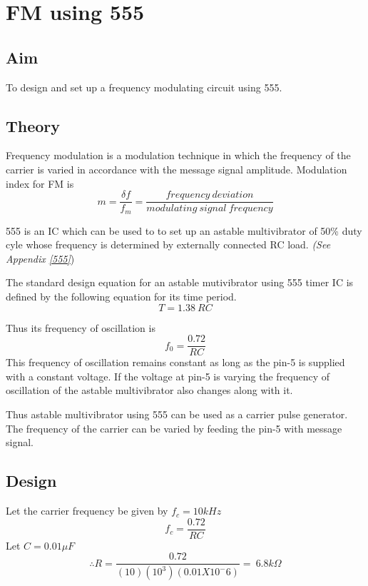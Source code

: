 \chapter[FM using 555]{FM using 555}

\section*{Aim}
To design and set up a frequency modulating circuit using 555.

\section*{Theory}
Frequency modulation is a modulation technique in which the frequency of the carrier is varied in accordance with the message signal amplitude.
Modulation index for FM is 
\begin{equation}
m= \frac{\delta f}{f_m}=\frac{frequency \ deviation}{modulating \ signal\  frequency}
\end{equation}

555 is an IC which can be used to to set up an astable multivibrator of 50\% duty cyle whose frequency is determined by externally connected RC load. \emph{(See Appendix \ref{555}})

\noindent The standard design equation for an astable mutivibrator using 555 timer IC is defined by the following equation for its time period.
\begin{equation}
T=1.38 \ RC
\end{equation}

\noindent Thus its frequency of oscillation is 
\begin{equation}
f_0 = \frac{0.72}{RC}
\end{equation}
This frequency of oscillation remains constant as long as the pin-5 is supplied with a constant voltage. If the voltage at pin-5 is varying the frequency of oscillation of the astable multivibrator also changes along with it.

Thus astable multivibrator using 555 can be used as a carrier pulse generator. The frequency of the carrier can be varied by feeding the pin-5 with message signal.
\section*{Design}
\noindent Let the carrier frequency be given by $f_c= 10 kHz$
\begin{equation}
f_c=\frac{0.72}{RC}
\end{equation}
\noindent Let $C=0.01 \mu F$
\begin{equation}
\therefore
R=\frac{0.72}{(10) (10^3)(0.01 X 10^-6)}= \ 6.8 k\Omega
\end{equation}


